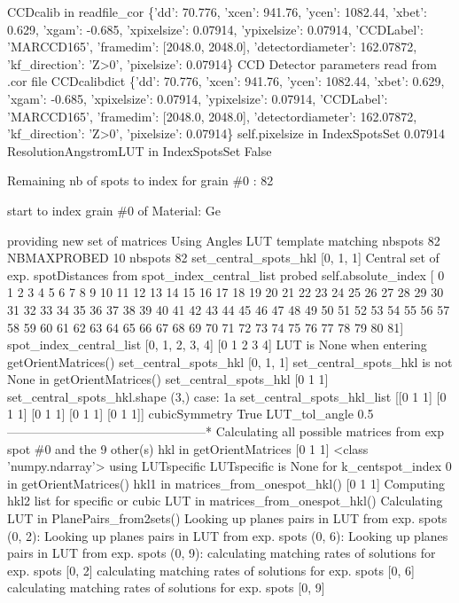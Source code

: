 \documentclass[letterpaper,10pt,english]{sphinxmanual}
\begin{document}
\begin{sphinxalltt}
CCDcalib in readfile\_cor \{'dd': 70.776, 'xcen': 941.76, 'ycen': 1082.44, 'xbet': 0.629, 'xgam': -0.685, 'xpixelsize': 0.07914, 'ypixelsize': 0.07914, 'CCDLabel': 'MARCCD165', 'framedim': {[}2048.0, 2048.0{]}, 'detectordiameter': 162.07872, 'kf\_direction': 'Z\textgreater{}0', 'pixelsize': 0.07914\}
CCD Detector parameters read from .cor file
CCDcalibdict \{'dd': 70.776, 'xcen': 941.76, 'ycen': 1082.44, 'xbet': 0.629, 'xgam': -0.685, 'xpixelsize': 0.07914, 'ypixelsize': 0.07914, 'CCDLabel': 'MARCCD165', 'framedim': {[}2048.0, 2048.0{]}, 'detectordiameter': 162.07872, 'kf\_direction': 'Z\textgreater{}0', 'pixelsize': 0.07914\}
self.pixelsize in IndexSpotsSet 0.07914
ResolutionAngstromLUT in IndexSpotsSet False

 Remaining nb of spots to index for grain \#0 : 82


 \sphinxstylestrong{**}
start to index grain \#0 of Material: Ge

\sphinxstylestrong{**}

providing new set of matrices Using Angles LUT template matching
nbspots 82
NBMAXPROBED 10
nbspots 82
set\_central\_spots\_hkl {[}0, 1, 1{]}
Central set of exp. spotDistances from spot\_index\_central\_list probed
self.absolute\_index {[} 0  1  2  3  4  5  6  7  8  9 10 11 12 13 14 15 16 17 18 19 20 21 22 23
 24 25 26 27 28 29 30 31 32 33 34 35 36 37 38 39 40 41 42 43 44 45 46 47
 48 49 50 51 52 53 54 55 56 57 58 59 60 61 62 63 64 65 66 67 68 69 70 71
 72 73 74 75 76 77 78 79 80 81{]}
spot\_index\_central\_list {[}0, 1, 2, 3, 4{]}
{[}0 1 2 3 4{]}
LUT is None when entering getOrientMatrices()
set\_central\_spots\_hkl {[}0, 1, 1{]}
set\_central\_spots\_hkl is not None in getOrientMatrices()
set\_central\_spots\_hkl {[}0 1 1{]}
set\_central\_spots\_hkl.shape (3,)
case: 1a
set\_central\_spots\_hkl\_list {[}{[}0 1 1{]}
 {[}0 1 1{]}
 {[}0 1 1{]}
 {[}0 1 1{]}
 {[}0 1 1{]}{]}
cubicSymmetry True
LUT\_tol\_angle 0.5
\sphinxstyleemphasis{---***}------------------------------------------------*
Calculating all possible matrices from exp spot \#0 and the 9 other(s)
hkl in getOrientMatrices {[}0 1 1{]} \textless{}class 'numpy.ndarray'\textgreater{}
using LUTspecific
LUTspecific is None for k\_centspot\_index 0 in getOrientMatrices()
hkl1 in matrices\_from\_onespot\_hkl() {[}0 1 1{]}
Computing hkl2 list for specific or cubic LUT in matrices\_from\_onespot\_hkl()
Calculating LUT in PlanePairs\_from2sets()
Looking up planes pairs in LUT from exp. spots (0, 2):
Looking up planes pairs in LUT from exp. spots (0, 6):
Looking up planes pairs in LUT from exp. spots (0, 9):
calculating matching rates of solutions for exp. spots {[}0, 2{]}
calculating matching rates of solutions for exp. spots {[}0, 6{]}
calculating matching rates of solutions for exp. spots {[}0, 9{]}



\end{sphinxalltt}
\end{document}
